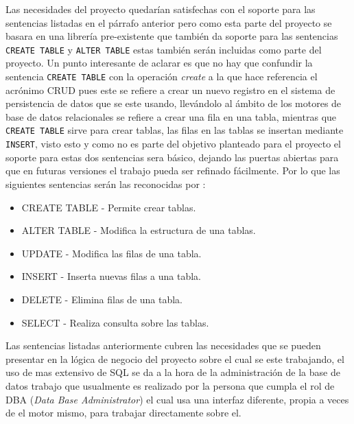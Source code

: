 Las necesidades del proyecto quedarían satisfechas con el soporte para las sentencias listadas en el párrafo anterior pero como esta parte del proyecto se basara en una librería pre-existente que también da soporte para las sentencias \verb=CREATE TABLE= y \verb=ALTER TABLE= estas también serán incluidas como parte del proyecto. Un punto interesante de aclarar es que no hay que confundir la sentencia \verb=CREATE TABLE= con la operación \textit{create} a la que hace referencia el acrónimo CRUD pues este se refiere a crear un nuevo registro en el sistema de persistencia de datos que se este usando, llevándolo al ámbito de los motores de base de datos relacionales se refiere a crear una fila en una tabla, mientras que \verb=CREATE TABLE= sirve para crear tablas, las filas en las tablas se insertan mediante \verb=INSERT=, visto esto y como no es parte del objetivo planteado para el proyecto el soporte para estas dos sentencias sera básico, dejando las puertas abiertas para que en futuras versiones el trabajo pueda ser refinado fácilmente. Por lo que las siguientes sentencias serán las reconocidas por \jj:
%
\begin{itemize}
\item CREATE TABLE - Permite crear tablas. 
\item ALTER TABLE - Modifica la estructura de una tablas.
\item UPDATE - Modifica las filas de una tabla.
\item INSERT - Inserta nuevas filas a una tabla.
\item DELETE - Elimina filas de una tabla.
\item SELECT - Realiza consulta sobre las tablas.
\end{itemize}
%
%
Las sentencias listadas anteriormente cubren las necesidades que se pueden presentar en la lógica de negocio del proyecto sobre el cual se este trabajando, el uso de mas extensivo de SQL se da a la hora de la administración de la base de datos trabajo que usualmente es realizado por la persona que cumpla el rol de DBA (\textit{Data Base Administrator}) el cual usa una interfaz diferente, propia a veces de el motor mismo, para trabajar directamente sobre el.


